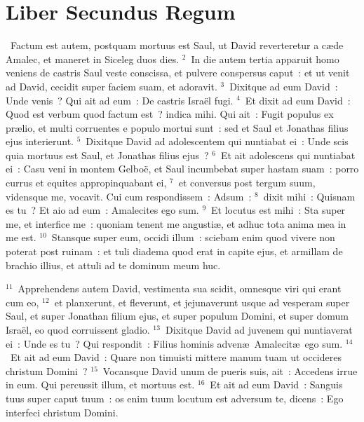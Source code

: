 \clearpage
{\centering \section*{Liber Secundus Regum}}\thispagestyle{empty}

~Factum est autem, postquam mortuus est Saul, ut David reverteretur a c\ae de Amalec, et maneret in Siceleg duos dies.
${}^{2}$~In die autem tertia apparuit homo veniens de castris Saul veste conscissa, et pulvere conspersus caput~: et ut venit ad David, cecidit super faciem suam, et adoravit.
${}^{3}$~Dixitque ad eum David~: Unde venis~? Qui ait ad eum~: De castris Isra\"el fugi.
${}^{4}$~Et dixit ad eum David~: Quod est verbum quod factum est~? indica mihi. Qui ait~: Fugit populus ex pr\ae lio, et multi corruentes e populo mortui sunt~: sed et Saul et Jonathas filius ejus interierunt.
${}^{5}$~Dixitque David ad adolescentem qui nuntiabat ei~: Unde scis quia mortuus est Saul, et Jonathas filius ejus~?
${}^{6}$~Et ait adolescens qui nuntiabat ei~: Casu veni in montem Gelbo\"e, et Saul incumbebat super hastam suam~: porro currus et equites appropinquabant ei,
${}^{7}$~et conversus post tergum suum, vidensque me, vocavit. Cui cum respondissem~: Adsum~:
${}^{8}$~dixit mihi~: Quisnam es tu~? Et aio ad eum~: Amalecites ego sum.
${}^{9}$~Et locutus est mihi~: Sta super me, et interfice me~: quoniam tenent me angusti\ae , et adhuc tota anima mea in me est.
${}^{10}$~Stansque super eum, occidi illum~: sciebam enim quod vivere non poterat post ruinam~: et tuli diadema quod erat in capite ejus, et armillam de brachio illius, et attuli ad te dominum meum huc.


${}^{11}$~Apprehendens autem David, vestimenta sua scidit, omnesque viri qui erant cum eo,
${}^{12}$~et planxerunt, et fleverunt, et jejunaverunt usque ad vesperam super Saul, et super Jonathan filium ejus, et super populum Domini, et super domum Isra\"el, eo quod corruissent gladio.
${}^{13}$~Dixitque David ad juvenem qui nuntiaverat ei~: Unde es tu~? Qui respondit~: Filius hominis adven\ae\ Amalecit\ae\ ego sum.
${}^{14}$~Et ait ad eum David~: Quare non timuisti mittere manum tuam ut occideres christum Domini~?
${}^{15}$~Vocansque David unum de pueris suis, ait~: Accedens irrue in eum. Qui percussit illum, et mortuus est.
${}^{16}$~Et ait ad eum David~: Sanguis tuus super caput tuum~: os enim tuum locutum est adversum te, dicens~: Ego interfeci christum Domini.


